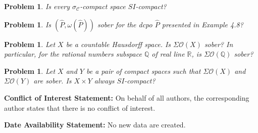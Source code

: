 \documentclass[preprint,12pt]{elsarticle}
\numberwithin{equation}{section}
\newtheorem{problem}[theorem]{Problem}
\begin{document}
\begin{problem} {\rm Is every $\sigma_{\mathcal{C}}$-compact space $SI$-compact?}
\end{problem}

\begin{problem} {\rm Is $(\widehat{P},\omega(\widehat{P}))$ sober for the dcpo $\widehat{P}$ presented in Example 4.8?}
\end{problem}

\begin{problem} {\rm Let $X$ be a countable Hausdorff space. Is $\Sigma\mathcal{O}(X)$ sober? In particular, for the rational numbers subspace $\mathbb{Q}$ of real line $\mathbb{R}$, is  $\Sigma \mathcal{O}(\mathbb{Q})$ sober?}
\end{problem}


\begin{problem} {\rm Let $X$ and $Y$ be a pair of compact spaces such that $\Sigma \mathcal{O}(X)$ and $\Sigma \mathcal{O}(Y)$ are sober. Is $X\times Y$ always $SI$-compact?}
\end{problem}
\vspace{0.3cm}

{\bf Conflict of Interest Statement:} On behalf of all authors, the corresponding author states that there is no conflict of interest.

\vspace{0.2cm}
{\bf Date Availability Statement:} No new data are created.
\end{document}
